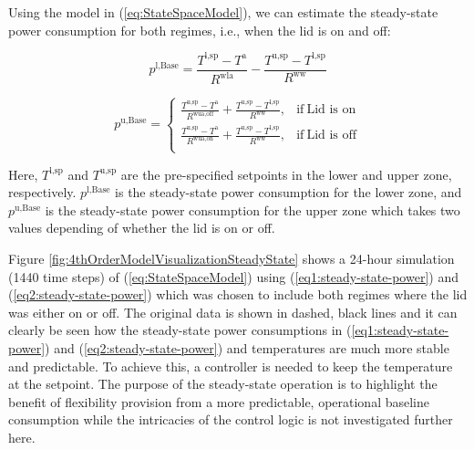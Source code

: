 \documentclass[lettersize,journal]{IEEEtran}
\begin{document}
Using the model in (\ref{eq:StateSpaceModel}), we can estimate the steady-state power consumption for both regimes, i.e., when the lid is on and off:


\begin{equation}\label{eq1:steady-state-power}
    p^{\text{l},\text{Base}} = \frac{T^{\text{l},\text{sp}} - T^{\text{a}}}{R^{\text{wla}}} - \frac{T^{\text{u},\text{sp}}-T^{\text{l},\text{sp}}}{R^{\text{ww}}}
\end{equation}

\begin{equation}\label{eq2:steady-state-power}
    p^{\text{u},\text{Base}}   =
    \begin{cases}
        \frac{T^{\text{u},\text{sp}} - T^{\text{a}}}{R^{\text{wua},\text{off}}}  + \frac{T^{\text{u},\text{sp}}-T^{\text{l},\text{sp}}}{R^{\text{ww}}}, & \text{if} \ \text{Lid is on}  \\
        \frac{T^{\text{u},\text{sp}} - T^{\text{a}}}{R^{\text{wua},\text{on}}} + \frac{T^{\text{u},\text{sp}}-T^{\text{l},\text{sp}}}{R^{\text{ww}}},   & \text{if} \ \text{Lid is off} \\
    \end{cases}
\end{equation}

Here, $T^{\text{l},\text{sp}}$ and $T^{\text{u},\text{sp}}$ are the pre-specified setpoints in the lower and upper zone, respectively. $p^{\text{l},\text{Base}}$ is the steady-state power consumption for the lower zone, and $p^{\text{u},\text{Base}}$ is the steady-state power consumption for the upper zone which takes two values depending of whether the lid is on or off.

Figure \ref{fig:4thOrderModelVisualizationSteadyState} shows a 24-hour simulation (1440 time steps) of (\ref{eq:StateSpaceModel}) using (\ref{eq1:steady-state-power}) and (\ref{eq2:steady-state-power}) which was chosen to include both regimes where the lid was either on or off. The original data is shown in dashed, black lines and it can clearly be seen how the steady-state power consumptions in (\ref{eq1:steady-state-power}) and (\ref{eq2:steady-state-power}) and temperatures are much more stable and predictable. To achieve this, a controller is needed to keep the temperature at the setpoint. The purpose of the steady-state operation is to highlight the benefit of flexibility provision from a more predictable, operational baseline consumption while the intricacies of the control logic is not investigated further here.
\end{document}
